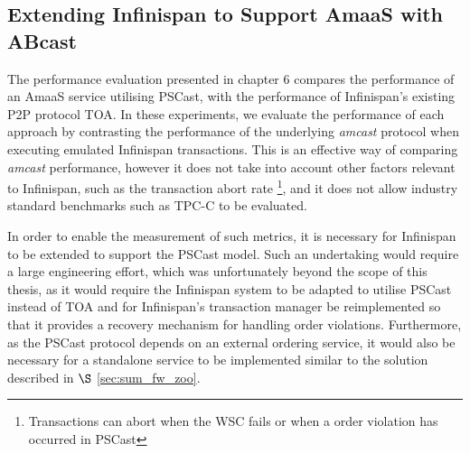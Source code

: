     \subsection{Extending Infinispan to Support AmaaS with ABcast}
    The performance evaluation presented in chapter 6 compares the performance of an \textsf{AmaaS} service utilising \textsf{PSCast}, with the performance of Infinispan's existing P2P protocol TOA.  In these experiments, we evaluate the performance of each approach by contrasting the performance of the underlying \emph{amcast} protocol when executing emulated Infinispan transactions.  This is an effective way of comparing \emph{amcast} performance, however it does not take into account other factors relevant to Infinispan, such as the transaction abort rate \footnote{Transactions can abort when the WSC fails or when a order violation has occurred in \textsf{PSCast}}, and it does not allow industry standard benchmarks such as TPC-C \citep{TPC-C} to be evaluated.  
    
    In order to enable the measurement of such metrics, it is necessary for Infinispan to be extended to support the \textsf{PSCast} model.  Such an undertaking would require a large engineering effort, which was unfortunately beyond the scope of this thesis, as it would require the Infinispan system to be adapted to utilise \textsf{PSCast} instead of \textsf{TOA} and for Infinispan's transaction manager be reimplemented so that it provides a recovery mechanism for handling order violations.  Furthermore, as the \textsf{PSCast} protocol depends on an external ordering service, it would also be necessary for a standalone service to be implemented similar to the solution described in $\S$ \ref{sec:sum_fw_zoo}.  
